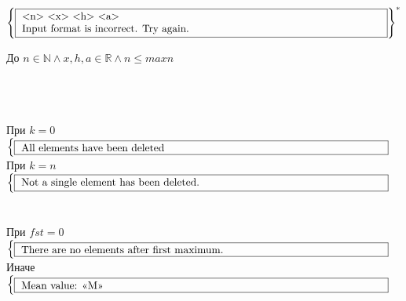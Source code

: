 \\[0.3cm]
\noindent
\begin{minipage}{0.4\textwidth}
    \(\left\{
        \fbox{
            \parbox{\textwidth} {
                \text{<n> <x> <h> <a>}\\
                \text{Input format is incorrect. Try again.}  
            }
        }
    \right\}^{*}\) 
\end{minipage}%
\hfill
\begin{minipage}{0.5\textwidth}
    До \(n \in \mathbb{N} \land x, h, a \in \mathbb{R} \land n \leq maxn\) 
\end{minipage}
\\[0.3cm]
\\[1cm]
\\[0.3cm]
При \(k = 0\) \\[0.15cm]
\(
\begin{cases}
    \fbox{
        \parbox{0.985\textwidth} {
            All elements have been deleted
        }
    }
\end{cases}
\)\\[0.3cm]
При \(k = n\) \\[0.15cm]
\(
\begin{cases}
    \fbox{
        \parbox{0.985\textwidth} {
            Not a single element has been deleted.
        }
    }
\end{cases}
\)\\[0.3cm]
\\[1cm]
\\[0.3cm]
При \(fst = 0\)\\[0.15cm]
\(
\begin{cases}
    \fbox{
        \parbox{0.985\textwidth} {
            There are no elements after first maximum.
        }
    }
\end{cases}
\)\\[0.3cm]
Иначе\\[0.15cm]
\(
\begin{cases}
    \fbox{
        \parbox{0.985\textwidth} {
            Mean value: <<M>>
        }
    }
\end{cases}
\)